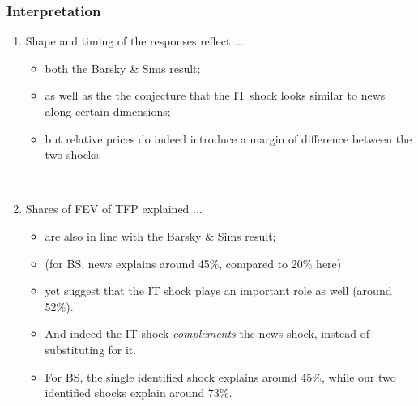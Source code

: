 \documentclass{beamer}
\begin{document}
\begin{frame}
	\frametitle{Interpretation}

\begin{enumerate}
 \item Shape and timing of the responses reflect ...
 
 
	\begin{itemize}
	\item both the Barsky \& Sims result;
	
	\vspace{0.1cm}
	
	\item as well as the the conjecture that the IT shock looks similar to news along certain dimensions; 
	
	\vspace{0.1cm}
	
	\item but relative prices do indeed introduce a margin of difference between the two shocks.
	\end{itemize}

\

\item Shares of FEV of TFP explained ...
	\begin{itemize}
	\item are also in line with the Barsky \& Sims result;
	\item [] (for BS, news explains around 45\%, compared to 20\% here)
	
	\vspace{0.1cm}
	
	\item  yet suggest that the IT shock plays an important role as well (around 52\%).
	
	\vspace{0.1cm}
	
	\item And indeed the IT shock \emph{complements} the news shock, instead of substituting for it.
	\item [] For BS, the single identified shock explains around 45\%, while our two identified shocks explain around 73\%.
	\end{itemize}

\end{enumerate}
		 	
\end{frame}
\end{document}
